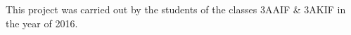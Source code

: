 \begin{titlepage}
    
    \vspace*{-2cm}     
    \begin{figure}[h]
        \centering
        \getHeadGraphics
    \end{figure}  
    
    \vspace{1cm}

    \begin{center}  
        \huge{\textbf{\MakeUppercase{\getDoctype}}}
        \vspace{2cm}
    
        \LARGE{\getMainTitle} \\
		    \large{\getSubTitle} \\

    \end{center}
    
    \vfill
    
    This project was carried out by the students of the classes 3AAIF \& 3AKIF in the year of 2016.

\end{titlepage}